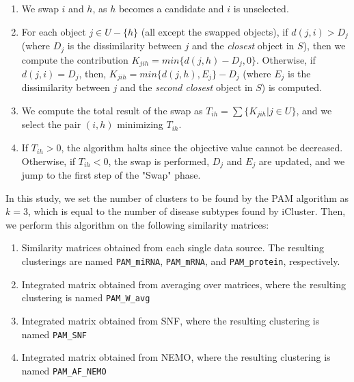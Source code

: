 \begin{itemize}[]
\begin{enumerate}[\IEEEsetlabelwidth{12)}]
        \begin{enumerate}[\IEEEsetlabelwidth{12)}]
            \item We swap $i$ and $h$, as $h$ becomes a candidate and $i$ is unselected.
            
            \item For each object $j \in U - \{h\}$ (all except the swapped objects), if $d(j, i) > D_{j}$ (where $D_{j}$ is the dissimilarity between $j$ and the \textit{closest} object in $S$), then we compute the contribution $K_{jih} = min\{d(j,h) - D_{j}, 0\}$. Otherwise, if $d(j, i) = D_{j}$, then, $K_{jih} = min\{d(j,h), E_{j}\} - D_{j}$ (where $E_{j}$ is the dissimilarity between $j$ and the \textit{second closest} object in $S$) is computed.
            
            \item We compute the total result of the swap as $T_{ih} = \sum\{ K_{jih} | j \in U\}$, and we select the pair $(i, h)$ minimizing $T_{ih}$.

            \item If $T_{ih} > 0$, the algorithm halts since the objective value cannot be decreased. Otherwise, if $T_{ih} < 0$, the swap is performed, $D_{j}$ and $E_{j}$ are updated, and we jump to the first step of the "Swap" phase.
        \end{enumerate}

    \end{enumerate}

    In this study, we set the number of clusters to be found by the PAM algorithm as $k = 3$, which is equal to the number of disease subtypes found by iCluster. Then, we perform this algorithm on the following similarity matrices:

    \begin{enumerate}[\IEEEsetlabelwidth{12)}]
        \item Similarity matrices obtained from each single data source. The resulting clusterings are named \verb|PAM_miRNA|, \verb|PAM_mRNA|, and \verb|PAM_protein|, respectively.
        \item Integrated matrix obtained from averaging over matrices, where the resulting clustering is named \verb|PAM_W_avg|
        \item Integrated matrix obtained from SNF, where the resulting clustering is named \verb|PAM_SNF|
        \item Integrated matrix obtained from NEMO, where the resulting clustering is named \verb|PAM_AF_NEMO|
    \end{enumerate}
    

\end{itemize}
